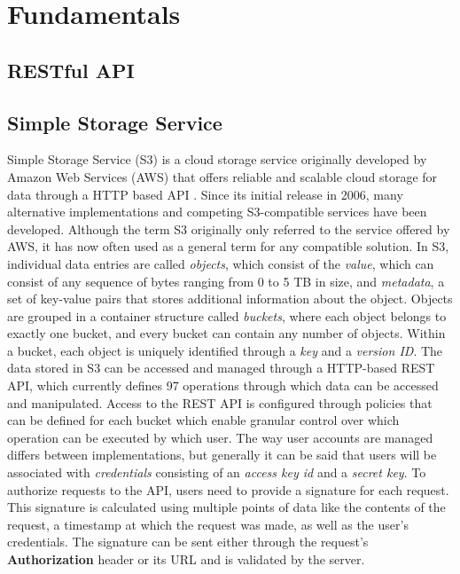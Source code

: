 \chapter{Fundamentals}

\section{RESTful API}

\section{Simple Storage Service}
\label{S3_desc}
Simple Storage Service (S3) is a cloud storage service originally developed by Amazon Web Services (AWS) that offers reliable and scalable cloud storage for data through a HTTP based API \cite{AWS_S3_Release} \cite{S3_API}. Since its initial release in 2006, many alternative implementations and competing S3-compatible services have been developed. Although the term S3 originally only referred to the service offered by AWS, it has now often used as a general term for any compatible solution.
In S3, individual data entries are called \textit{objects}, which consist of the \textit{value}, which can consist of any sequence of bytes ranging from 0 to 5 TB in size\cite{AWS_S3_Object}, and \textit{metadata}, a set of key-value pairs that stores additional information about the object. Objects are grouped in a container structure called \textit{buckets}, where each object belongs to exactly one bucket, and every bucket can contain any number of objects. Within a bucket, each object is uniquely identified through a \textit{key} and a \textit{version ID}.
The data stored in S3 can be accessed and managed through a HTTP-based REST API, which currently defines 97\cite{S3_API_Actions} operations through which data can be accessed and manipulated.
Access to the REST API is configured through policies that can be defined for each bucket which enable granular control over which operation can be executed by which user. The way user accounts are managed differs between implementations, but generally it can be said that users will be associated with \textit{credentials} consisting of an \textit{access key id} and a \textit{secret key}. To authorize requests to the API, users need to provide a signature for each request. This signature is calculated using multiple points of data like the contents of the request, a timestamp at which the request was made, as well as the user's credentials. The signature can be sent either through the request's \textbf{Authorization} header or its URL and is validated by the server.

